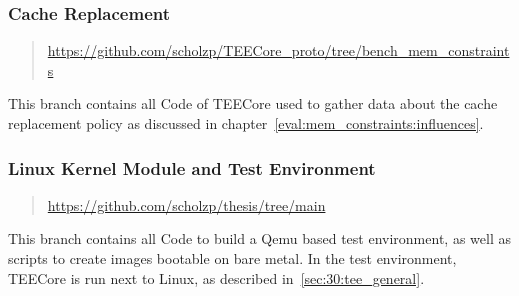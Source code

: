 \subsubsection{Cache Replacement}
\begin{quote}
  \url{https://github.com/scholzp/TEECore_proto/tree/bench_mem_constraints}
\end{quote}

\noindent
This branch contains all Code of TEECore used to gather data about the cache
replacement policy as discussed in
chapter~\ref{eval:mem_constraints:influences}.

\subsubsection{Linux Kernel Module and Test Environment}
\begin{quote}
  \url{https://github.com/scholzp/thesis/tree/main}
\end{quote}

\noindent
This branch contains all Code to build a Qemu based test environment, as well as
scripts to create images bootable on bare metal. In the test environment,
TEECore is run next to Linux, as described in~\ref{sec:30:tee_general}.
